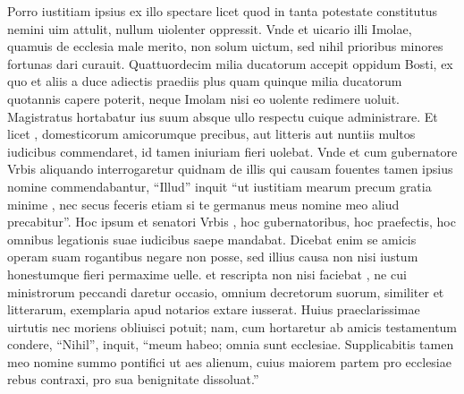 \documentclass[a5paper,twoside]{article}
\begin{document}
Porro iustitiam ipsius ex illo spectare licet quod in tanta  potestate constitutus nemini uim attulit, nullum uiolenter oppressit. Vnde et uicario illi Imolae, quamuis de ecclesia male merito, non solum uictum, sed nihil prioribus minores fortunas dari curauit. Quattuordecim  milia ducatorum accepit   oppidum Bosti, ex quo et aliis a duce adiectis praediis plus quam quinque milia ducatorum quotannis capere poterit, neque Imolam nisi eo uolente redimere uoluit. Magistratus hortabatur ius suum absque ullo respectu cuique administrare. Et licet , domesticorum amicorumque  precibus, aut litteris aut nuntiis multos iudicibus commendaret, id tamen   iniuriam fieri uolebat. Vnde et cum  gubernatore Vrbis aliquando interrogaretur quidnam de illis  qui  causam fouentes tamen ipsius nomine commendabantur, ``Illud'' inquit ``ut iustitiam mearum precum gratia minime , nec secus feceris etiam si te germanus meus  nomine meo aliud precabitur''.  Hoc ipsum et senatori Vrbis , hoc gubernatoribus, hoc praefectis, hoc omnibus legationis suae iudicibus saepe mandabat.  Dicebat enim se amicis operam suam rogantibus negare non posse, sed illius causa non nisi iustum honestumque fieri permaxime uelle.   et rescripta non nisi  faciebat , ne cui ministrorum peccandi daretur occasio, omnium decretorum suorum, similiter et litterarum, exemplaria apud notarios extare iusserat.  Huius praeclarissimae uirtutis nec moriens obliuisci potuit; nam, cum hortaretur ab amicis testamentum condere, ``Nihil'', inquit, ``meum habeo; omnia sunt ecclesiae. Supplicabitis tamen meo nomine summo pontifici ut aes alienum, cuius maiorem partem pro  ecclesiae rebus contraxi, pro sua benignitate dissoluat.''
\end{document}
